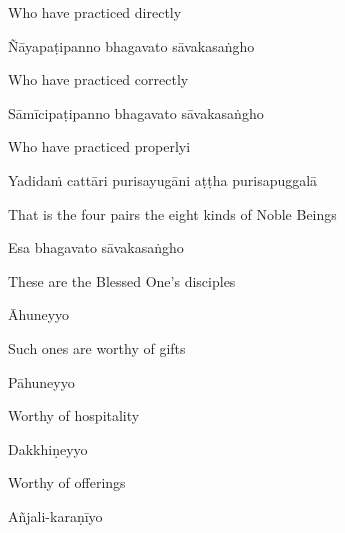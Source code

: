 \begin{english}
  Who have practiced directly\hyperlink{endnote5-appendix}{\hypertarget{endnote5-body}{}}
\end{english}

Ñāyapaṭipanno bhagavato sāvakasaṅgho\hyperlink{endnote6-appendix}{\hypertarget{endnote6-body}{}}

\begin{english}
  Who have practiced correctly\hyperlink{endnote7-appendix}{\hypertarget{endnote7-body}{}}
\end{english}

Sāmīcipaṭipanno bhagavato sāvakasaṅgho

\begin{english}
  Who have practiced properlyi
\end{english}

Yadidaṁ cattāri purisayugāni aṭṭha purisapuggalā

\begin{english}
  That is the four pairs the eight kinds of Noble Beings
\end{english}

Esa bhagavato sāvakasaṅgho

\begin{english}
  These are the Blessed One's disciples
\end{english}

Āhuneyyo

\begin{english}
  Such ones are worthy of gifts
\end{english}

Pāhuneyyo

\begin{english}
  Worthy of hospitality
\end{english}

Dakkhiṇeyyo

\begin{english}
  Worthy of offerings
\end{english}

Añjali-karaṇīyo

